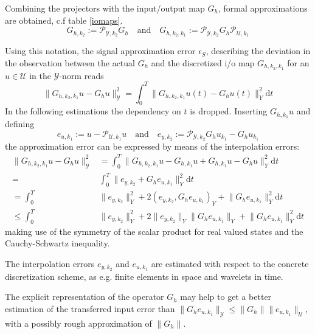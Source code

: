 \documentclass[a4paper,10pt,BCOR=15mm]{scrbook}
\providecommand{\norm}[1]{\lVert#1 \rVert}
\providecommand{\inva}[1]{\text{d} #1}
\providecommand{\andi}[0]{\quad \text{and} \quad}
\begin{document}
Combining the projectors with the input/output map $G_h$, formal approximations are obtained, c.f table \ref{iomaps}.
\begin{equation*}
 G_{h,k_2} := \mathscr P _ {\mathcal Y,k_2} G_h  \andi G_{h,k_2,k_1} := \mathscr P _ {\mathcal Y,k_2} G_h \mathscr P _ {\mathcal U,k_1}
\end{equation*}

Using this notation, the signal approximation error $\epsilon _S$, describing the deviation in the observation between the actual $G_h$ and the
discretized i/o map $G_{h,k_2,k_1}$ for an $u\in \mathcal U$ in the $\mathcal Y$-norm reads
\begin{equation*}
 \norm{G_{h,k_2,k_1}u - G_hu}_{\mathcal Y} ^2 = \int_0^T \norm{G_{h,k_2,k_1}u(t) - G_hu(t)}_Y ^2 \inva t
\end{equation*} 
In the following estimations the dependency on $t$ is dropped. Inserting $ G_{h,k_1} u$ and defining 
\begin{equation*}
e_{u,k_1} := u - \mathscr P _ {\mathcal U,k_1} u \andi e_{y,k_2} :=  \mathscr P _ {\mathcal Y,k_2} G_hu_{k_1} -G_hu_{k_1}
\end{equation*}
the approximation error can be expressed by means of the interpolation errors:
\begin{align*}
 \norm{G_{h,k_2,k_1}u - G_hu}_{\mathcal Y} ^2 &= \int_0^T \norm{G_{h,k_2,k_1}u -G_{h,k_1}u +G_{h,k_1} u - G_hu}_Y ^2 \inva t \\ 
=& \int_0^T \norm{ e_{y,k_2}+G_{h}e_{u,k_1}}_Y ^2  \inva t \\
=  \int_0^T& \norm{e_{y,k_2}}_Y ^2+2(e_{y,k_2},G_{h}e_{u,k_1})_Y +\norm{G_{h}e_{u,k_1}}_Y^2 \inva t \\
\leq \int_0^T & \norm{e_{y,k_2}}_Y^2+2 \norm{e_{y,k_2}}_Y \norm{G_{h}e_{u,k_1}}_Y +\norm{G_{h}e_{u,k_1}}_Y ^2 \inva t 
\end{align*}
making use of the symmetry of the scalar product for real valued states and the Cauchy-Schwartz inequality.

The interpolation errors $e_{y,k_2}$ and $e_{u,k_1}$ are estimated with respect to the concrete discretization scheme, as e.g. finite elements in space and wavelets in time. 

The explicit representation of the operator $G_h$ may help to get a better estimation of the transferred input error than $\norm{G_h e_{u,k_1}}_{\mathcal Y} \leq \norm{G_h} \norm {e_{u,k_1}}_{\mathcal U}$, with a possibly rough approximation of $\norm{G_h}$. 
\end{document}
